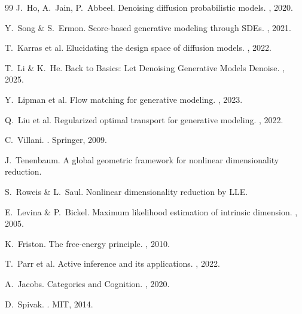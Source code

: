 \documentclass[11pt,a4paper,twocolumn]{article}
\begin{document}
\begin{thebibliography}{99}
J.~Ho, A.~Jain, P.~Abbeel.
\newblock Denoising diffusion probabilistic models.
, 2020.

Y.~Song \& S.~Ermon.
\newblock Score-based generative modeling through SDEs.
, 2021.

T.~Karras et al.
\newblock Elucidating the design space of diffusion models.
, 2022.

T.~Li \& K.~He.
\newblock Back to Basics: Let Denoising Generative Models Denoise.
, 2025.

Y.~Lipman et al.
\newblock Flow matching for generative modeling.
, 2023.

Q.~Liu et al.
\newblock Regularized optimal transport for generative modeling.
, 2022.

C.~Villani.
.
\newblock Springer, 2009.

J.~Tenenbaum.
\newblock A global geometric framework for nonlinear dimensionality reduction.

S.~Roweis \& L.~Saul.
\newblock Nonlinear dimensionality reduction by LLE.

E.~Levina \& P.~Bickel.
\newblock Maximum likelihood estimation of intrinsic dimension.
, 2005.

K.~Friston.
\newblock The free-energy principle.
, 2010.

T.~Parr et al.
\newblock Active inference and its applications.
, 2022.

A.~Jacobs.
\newblock Categories and Cognition.
, 2020.

D.~Spivak.
.
\newblock MIT, 2014.

\end{thebibliography}
\end{document}

